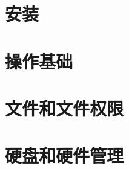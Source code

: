 \documentclass{article}
\begin{document}
	
	\section{安装}
	\section{操作基础}
	\section{文件和文件权限}
	\section{硬盘和硬件管理}
	
	
	
\end{document}
